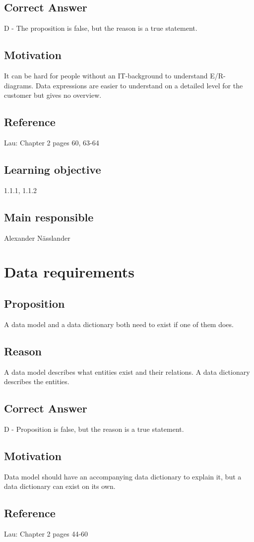 \documentclass[a4paper]{article}
\begin{document}
\subsection*{Correct Answer}
D - The proposition is false, but the reason is a true statement.
\subsection*{Motivation}
It can be hard for people without an IT-background to understand E/R-diagrams. Data expressions are easier to understand on a detailed level for the customer but gives no overview. 
\subsection*{Reference}
Lau: Chapter 2 pages 60, 63-64
\subsection*{Learning objective}
1.1.1, 1.1.2
\subsection*{Main responsible}
Alexander Nässlander


\section{Data requirements}
\subsection*{Proposition}
A data model and a data dictionary both need to exist if one of them does.
\subsection*{Reason}
A data model describes what entities exist and their relations. A data dictionary describes the entities.
\subsection*{Correct Answer}
D - Proposition is false, but the reason is a true statement.
\subsection*{Motivation}
Data model should have an accompanying data dictionary to explain it, but a data dictionary can exist on its own.
\subsection*{Reference}
Lau: Chapter 2 pages 44-60
\end{document}
